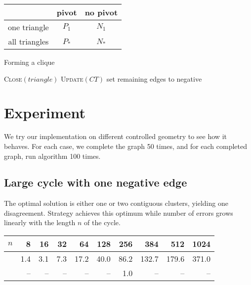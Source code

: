 \begin{center}
\begin{tabular}{ccc}
\toprule
& pivot & no pivot \\
\midrule
one triangle & $P_1$ & $N_1$ \\
all triangles & $P_*$ & $N_*$ \\
\bottomrule
\end{tabular}
\end{center}

\begin{algorithm}
	\caption{Forming a clique \label{alg:complete}}
	\begin{algorithmic}[0]
				\State \textsc{Close}$(triangle)$
			\EndFor
			\State \textsc{Update}$(CT)$
		\EndWhile
		\State set remaining edges to negative
	\end{algorithmic}
\end{algorithm}

\section{Experiment}

We try our implementation on different controlled geometry to see how it
behaves. For each case, we complete the graph 50 times, and for each completed
graph, run \ccp{} algorithm 100 times.

\subsection{Large cycle with one negative edge}

The optimal solution is either one or two contiguous clusters, yielding one
disagreement. Strategy \pat{} achieves this optimum while \pot{} number of
errors grows linearly with the length $n$ of the cycle.

\begin{center}
\begin{tabular}{lrrrrrrrrr}
\toprule
$n$      & 8   & 16  & 32  & 64   & 128  & 256  & 384   & 512   & 1024 \\
\midrule
\pot{}    & 1.4 & 3.1 & 7.3 & 17.2 & 40.0 & 86.2 & 132.7 & 179.6 & 371.0 \\
\pat{}    & --  & --  & --  & --   & --   & 1.0  & --    & --    & -- \\
\bottomrule
\end{tabular}
\end{center}

